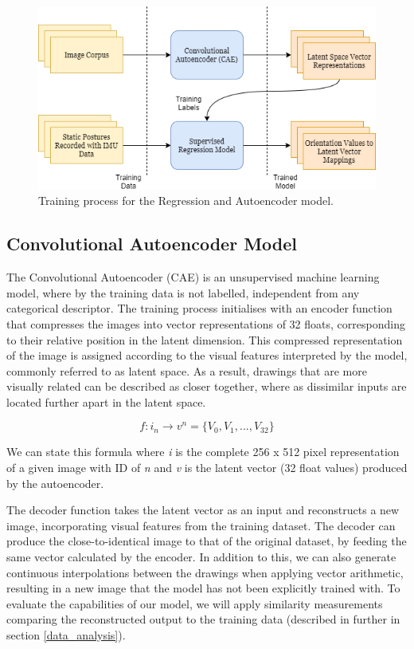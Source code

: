 \begin{figure}[ht]
    \centering
    \includegraphics[width=\textwidth]{Chapters/Figures/modi_dis/training_process.png}
    \caption{Training process for the Regression and Autoencoder model.}
    \label{fig:training_fig}
\end{figure}

\subsection{Convolutional Autoencoder Model}

The Convolutional Autoencoder (CAE) is an unsupervised machine learning model, where by the training data is not labelled, independent from any categorical descriptor. The training process initialises with an encoder function that compresses the images into vector representations of 32 floats, corresponding to their relative position in the latent dimension. This compressed representation of the image is assigned according to the visual features interpreted by the model, commonly referred to as latent space. As a result, drawings that are more visually related can be described as closer together, where as dissimilar inputs are located further apart in the latent space.

\[ f:i_n\xrightarrow{}v^n = \{V_0, V_1,... ,V_{32}\} \]

We can state this formula where \textit{i} is the complete 256 x 512 pixel representation of a given image with ID of \textit{n} and \textit{v} is the latent vector (32 float values) produced by the autoencoder.

The decoder function takes the latent vector as an input and reconstructs a new image, incorporating visual features from the training dataset. The decoder can produce the close-to-identical image to that of the original dataset, by feeding the same vector calculated by the encoder. In addition to this, we can also generate continuous interpolations between the drawings when applying vector arithmetic, resulting in a new image that the model has not been explicitly trained with. To evaluate the capabilities of our model, we will apply similarity measurements comparing the reconstructed output to the training data (described in further in section \ref{data_analysis}).

